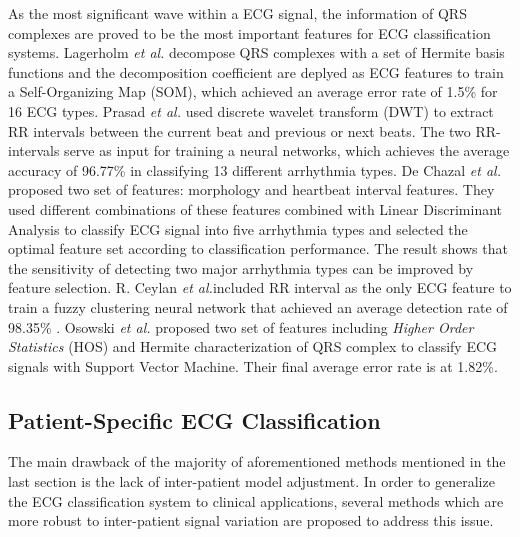 As the most significant wave within a ECG signal, the information of QRS complexes are proved to be the most important features for ECG classification systems. Lagerholm \textit{et al.} decompose QRS complexes with a set of Hermite basis functions and the decomposition coefficient are deplyed as ECG features to train a Self-Organizing Map (SOM), which achieved an average error rate of 1.5\% for 16 ECG types\cite{lagerholm2000clustering}. Prasad \textit{et al.} used discrete wavelet transform (DWT) to extract RR intervals between the current beat and previous or next beats. The two RR-intervals serve as input for training a neural networks, which achieves the average accuracy of 96.77\% in classifying 13 different arrhythmia types. De Chazal \textit{et al.} proposed two set of features: morphology and heartbeat interval features. They used different combinations of these features combined with Linear Discriminant Analysis to classify ECG signal into five arrhythmia types and selected the optimal feature set according to classification performance\cite{autofs}. The result shows that the sensitivity of detecting two major arrhythmia types can be improved by feature selection. R. Ceylan \textit{et al.}included RR interval as the only ECG feature to train a fuzzy clustering neural network that achieved an average detection rate of 98.35\%\cite{ceylan2009novel} . Osowski \textit{et al.} proposed two set of features including \textit{Higher Order Statistics} (HOS) and Hermite characterization of QRS complex to classify ECG signals with Support Vector Machine. Their final average error rate is at 1.82\%\cite{osowski2004support}. %

\subsection{Patient-Specific ECG Classification}

The main drawback of the majority of aforementioned methods mentioned in the last section is the lack of inter-patient model adjustment. In order to generalize the ECG classification system to clinical applications, several methods which are more robust to inter-patient signal variation are proposed to address this issue\cite{Hu_et_al,deChazal2006,llamedo2012automatic,bbnn,ince2009generic,Kiranyaz}.

